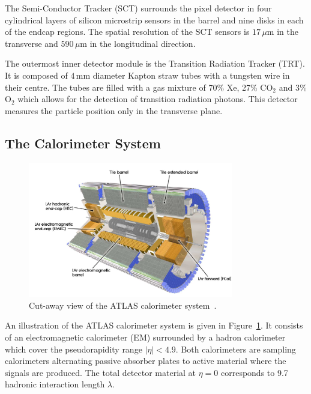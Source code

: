 The Semi-Conductor Tracker (SCT) surrounds the pixel detector in four cylindrical layers of silicon microstrip sensors in the barrel
and nine disks in each of the  endcap regions. 
The spatial resolution of the SCT sensors is $17\,\mu$m in the transverse and $590\,\mu$m 
in the longitudinal direction.

The outermost inner detector module is the Transition Radiation Tracker (TRT). It is composed of $4\,$mm diameter Kapton straw tubes
with a tungsten wire in their centre. The tubes are filled with a gas mixture of 70\% Xe, 27\% CO$_2$
and 3\% $\text{O}_2$  which allows for the detection of transition 
radiation photons. This detector measures the particle position only in the transverse plane.




\subsection{The Calorimeter System}

\begin{figure}[tp]
     \begin{center}

            \includegraphics[width=0.8\textwidth]{figure/Calo.png}

    \end{center}
    \caption{Cut-away view of the ATLAS calorimeter system~\cite{ATLASDetector}.}



   \label{fig:atlasCal}
\end{figure}

An illustration of the ATLAS calorimeter system is given in Figure~\ref{fig:atlasCal}. It consists of an electromagnetic calorimeter (EM) 
surrounded by a hadron calorimeter which cover the pseudorapidity 
range $|\eta| < 4.9$.
%
Both  calorimeters are sampling calorimeters alternating passive absorber plates to active material 
where the signals are produced.
The total detector material  at $\eta = 0$ corresponds to 9.7 hadronic interaction length $\lambda$. 

